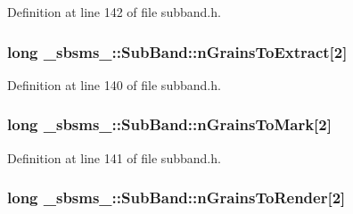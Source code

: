 Definition at line 142 of file subband.\+h.

\subsubsection[{\texorpdfstring{n\+Grains\+To\+Extract}{nGrainsToExtract}}]{\setlength{\rightskip}{0pt plus 5cm}long \+\_\+sbsms\+\_\+\+::\+Sub\+Band\+::n\+Grains\+To\+Extract\mbox{[}2\mbox{]}\hspace{0.3cm}{\ttfamily [protected]}}\hypertarget{class__sbsms___1_1_sub_band_a960ac229e4b3a36a5e1f16673d6fd6cd}{}\label{class__sbsms___1_1_sub_band_a960ac229e4b3a36a5e1f16673d6fd6cd}


Definition at line 140 of file subband.\+h.

\subsubsection[{\texorpdfstring{n\+Grains\+To\+Mark}{nGrainsToMark}}]{\setlength{\rightskip}{0pt plus 5cm}long \+\_\+sbsms\+\_\+\+::\+Sub\+Band\+::n\+Grains\+To\+Mark\mbox{[}2\mbox{]}\hspace{0.3cm}{\ttfamily [protected]}}\hypertarget{class__sbsms___1_1_sub_band_a23a319af58bf3bb4462539d12e421a73}{}\label{class__sbsms___1_1_sub_band_a23a319af58bf3bb4462539d12e421a73}


Definition at line 141 of file subband.\+h.

\subsubsection[{\texorpdfstring{n\+Grains\+To\+Render}{nGrainsToRender}}]{\setlength{\rightskip}{0pt plus 5cm}long \+\_\+sbsms\+\_\+\+::\+Sub\+Band\+::n\+Grains\+To\+Render\mbox{[}2\mbox{]}\hspace{0.3cm}{\ttfamily [protected]}}\hypertarget{class__sbsms___1_1_sub_band_a1c1edb80b54fed8c6eeae9c765adb766}{}\label{class__sbsms___1_1_sub_band_a1c1edb80b54fed8c6eeae9c765adb766}


